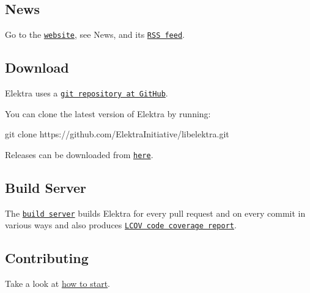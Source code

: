 \subsection*{News}

Go to the \href{https://www.libelektra.org}{\tt website}, see News, and its \href{https://www.libelektra.org/news/feed.rss}{\tt R\+SS feed}.

\subsection*{Download}

Elektra uses a \href{https://github.com/ElektraInitiative/libelektra}{\tt git repository at Git\+Hub}.

You can clone the latest version of Elektra by running\+: \begin{DoxyVerb}     git clone https://github.com/ElektraInitiative/libelektra.git
\end{DoxyVerb}


Releases can be downloaded from \href{https://www.libelektra.org/ftp/elektra/releases/}{\tt here}.

\subsection*{Build Server}

The \href{https://build.libelektra.org/}{\tt build server} builds Elektra for every pull request and on every commit in various ways and also produces \href{https://doc.libelektra.org/coverage/master/debian-stable-full/}{\tt L\+C\+OV code coverage report}.

\subsection*{Contributing}

Take a look at \hyperlink{doc_IDEAS_md}{how to start}. 